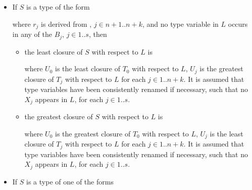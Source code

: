 \documentclass[makeidx]{article}
\begin{document}
{\begin{itemize}
\begin{itemize}
    \noindent

    \noindent
    where
    $U_0$ is the least closure of $T_0$ with respect to $L$,
    $U_j$ is the greatest closure of $T_j$ with respect to $L$
    for each $j \in 1 .. n + k$.
    It is assumed that type variables have been consistently renamed
    if necessary,
    such that no $X_j$ appears in $L$,
    for each $j \in 1 .. s$.
  \item
    the greatest closure of $S$ with respect to $L$ is

    \noindent

    \noindent
    where $U_0$ is the greatest closure of $T_0$ with respect to $L$,
    $U_j$ is the least closure of $T_j$ with respect to $L$
    for each $j \in 1 .. n + k$.
    It is assumed that type variables have been consistently renamed
    if necessary,
    such that no $X_j$ appears in $L$,
    for each $j \in 1 .. s$.
  \end{itemize}
\item
  If $S$ is a type of the form

  \noindent

  \noindent
  where $r_j$ is derived from , $j \in n + 1 .. n + k$,
  and no type variable in $L$ occurs in any of the $B_j$, $j \in 1 .. s$,
  then
  \begin{itemize}
  \item
    the least closure of $S$ with respect to $L$ is

    \noindent

    \noindent
    where
    $U_0$ is the least closure of $T_0$ with respect to $L$,
    $U_j$ is the greatest closure of $T_j$ with respect to $L$
    for each $j \in 1 .. n + k$.
    It is assumed that type variables have been consistently renamed
    if necessary,
    such that no $X_j$ appears in $L$,
    for each $j \in 1 .. s$.
  \item
    the greatest closure of $S$ with respect to $L$ is

    \noindent

    \noindent
    where $U_0$ is the greatest closure of $T_0$ with respect to $L$,
    $U_j$ is the least closure of $T_j$ with respect to $L$
    for each $j \in 1 .. n + k$.
    It is assumed that type variables have been consistently renamed
    if necessary,
    such that no $X_j$ appears in $L$,
    for each $j \in 1 .. s$.
  \end{itemize}
\item
  If $S$ is a type of one of the forms


\end{itemize}}
\end{document}
